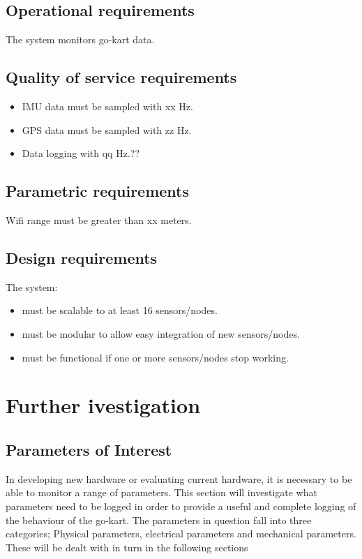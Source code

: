 \subsection{Operational requirements}
The system monitors go-kart data.%

\subsection{Quality of service requirements}
\begin{itemize}
\item IMU data must be sampled with xx Hz.
\item GPS data must be sampled with zz Hz.
\item Data logging with qq Hz.??
\end{itemize}

\subsection{Parametric requirements}
Wifi range must be greater than xx meters.

\subsection{Design requirements}
The system:
\begin{itemize}
\item must be scalable to at least 16 sensors/nodes.
\item must be modular to allow easy integration of new sensors/nodes.
\item must be functional if one or more sensors/nodes stop working.	 
\end{itemize}



\newpage
\section{Further ivestigation}

\subsection{Parameters of Interest}
In developing new hardware or evaluating current hardware, it is necessary to be able to monitor a range of parameters.
This section will investigate what parameters need to be logged in order to provide a useful and complete logging of the behaviour of the go-kart.
The parameters in question fall into three categories; Physical parameters, electrical parameters and mechanical parameters.
These will be dealt with in turn in the following sections
